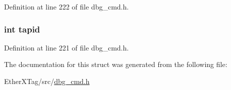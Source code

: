 Definition at line 222 of file dbg\-\_\-cmd.\-h.

\hypertarget{structdbg__cmd__type__get__jtag__chain_a33e5e67c2641f7f5ca46be79b3222310}{
\subsubsection[{tapid}]{\setlength{\rightskip}{0pt plus 5cm}int tapid}}\label{structdbg__cmd__type__get__jtag__chain_a33e5e67c2641f7f5ca46be79b3222310}


Definition at line 221 of file dbg\-\_\-cmd.\-h.



The documentation for this struct was generated from the following file\-:\begin{DoxyCompactItemize}
\item 
Ether\-X\-Tag/src/\hyperlink{dbg__cmd_8h}{dbg\-\_\-cmd.\-h}\end{DoxyCompactItemize}
